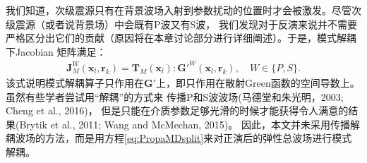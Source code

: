 我们知道，次级震源只有在背景波场入射到参数扰动的位置时才会被激发。尽管次级震源（或者说背景场）中会既有P波又有S波，
我们发现对于反演来说并不需要严格区分出它们的贡献（原因将在本章讨论部分进行详细阐述）。于是，模式解耦下Jacobian
矩阵满足：
\begin{equation}
        \begin{split} 
        \mathbf{J}^W_M(\mathbf{x}_l,\mathbf{r}_k)=
        \mathbf{T}_M(\mathbf{x}_l):\mathbf{G}'^W(\mathbf{x}_l,\mathbf{r}_k),\quad
        W\in\{P, S\}.
        \end{split}
        \label{eq:EquivFre1}
\end{equation}
该式说明模式解耦算子只作用在$\mathbf{G}'$上，即只作用在散射Green函数的空间导数上。虽然有些学者尝试用“解耦”的方式来
传播P和S波波场(马德堂和朱光明，2003\cite{马德堂2003}; Cheng et al.,
2016\cite{cheng:2016})，
但是只能在介质参数足够光滑的时候才能获得令人满意的结果(Brytik et al., 2011\cite{brytik:2011};
Wang and McMechan, 2015\cite{wang.mcmechan:2015b})。
因此，本文并未采用传播解耦波场的方法，而是用方程\eqref{eq:PropaMDsplit}来对正演后的弹性总波场进行模式解耦。

